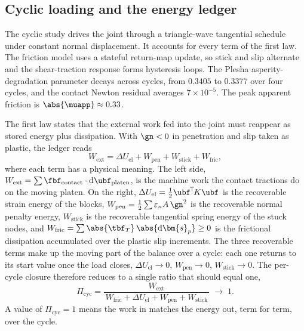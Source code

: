 \subsection{Cyclic loading and the energy ledger}\label{app:supp:p4}

The cyclic study drives the joint through a triangle-wave tangential schedule under constant normal
displacement. It accounts for every term of the first law. The friction model uses a stateful
return-map update, so stick and slip alternate and the shear-traction response forms hysteresis loops.
The Plesha asperity-degradation parameter decays across cycles, from $0.3405$ to $0.3377$ over four
cycles, and the contact Newton residual averages $7\times10^{-5}$. The peak apparent friction is
$\abs{\muapp}\approx0.33$.

The first law states that the external work fed into the joint must reappear as stored energy plus
dissipation. With $\gn<0$ in penetration and slip taken as plastic, the ledger reads
%
\begin{equation}\label{eq:supp_ledger}
W_{\mathrm{ext}}
= \Delta U_{\mathrm{el}}
+ W_{\mathrm{pen}}
+ W_{\mathrm{stick}}
+ W_{\mathrm{fric}},
\end{equation}
%
where each term has a physical meaning. The left side, $W_{\mathrm{ext}}=\sum \fbf_{\mathrm{contact}}\cdot
\mathrm{d}\ubf_{\mathrm{platen}}$, is the machine work the contact tractions do on the moving platen. On
the right, $\Delta U_{\mathrm{el}}=\tfrac12\ubf^{\!\top}\!K\ubf$ is the recoverable strain energy of the
blocks, $W_{\mathrm{pen}}=\tfrac12\sum\varepsilon_n A\,\gn^{2}$ is the recoverable normal penalty energy,
$W_{\mathrm{stick}}$ is the recoverable tangential spring energy of the stuck nodes, and
$W_{\mathrm{fric}}=\sum\abs{\tbf_T}\,\abs{\mathrm{d}\bm{s}_p}\ge0$ is the frictional dissipation
accumulated over the plastic slip increments. The three recoverable terms make up the moving part of the
balance over a cycle: each one returns to its start value once the load closes,
$\Delta U_{\mathrm{el}}\to0$, $W_{\mathrm{pen}}\to0$, $W_{\mathrm{stick}}\to0$. The per-cycle closure
therefore reduces to a single ratio that should equal one,
%
\begin{equation}\label{eq:supp_closure}
\Pi_{\mathrm{cyc}}
= \frac{W_{\mathrm{ext}}}
{\,W_{\mathrm{fric}}+\Delta U_{\mathrm{el}}+W_{\mathrm{pen}}+W_{\mathrm{stick}}\,}
\;\longrightarrow\; 1 .
\end{equation}
%
A value of $\Pi_{\mathrm{cyc}}=1$ means the work in matches the energy out, term for term, over the cycle.

